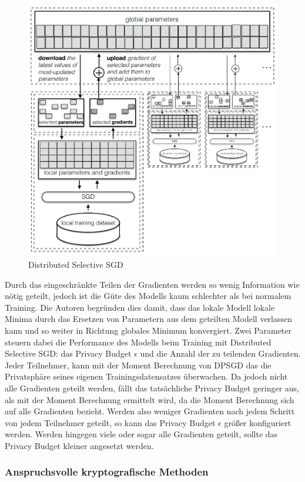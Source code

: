 \begin{figure}[!htb]
    \centering
    \includegraphics[width=12cm]{figures/dssgd}
    \caption{Distributed Selective SGD \cite{P-78}}
    \label{fig:dssgd}
\end{figure} 

Durch das eingeschränkte Teilen der Gradienten werden so wenig Information wie nötig geteilt, jedoch ist die Güte des Modells kaum schlechter als bei normalem Training.
Die Autoren begründen dies damit, dass das lokale Modell lokale Minima durch das Ersetzen von Parametern aus dem geteilten Modell verlassen kann und so weiter in Richtung globales Minimum konvergiert. 
Zwei Parameter steuern dabei die Performance des Modells beim Training mit Distributed Selective SGD: das Privacy Budget $\epsilon$ und die Anzahl der zu teilenden Gradienten.
Jeder Teilnehmer, kann mit der Moment Berechnung von DPSGD \cite{P-28} das die Privatsphäre seines eigenen Trainingsdatensatzes überwachen.
Da jedoch nicht alle Gradienten geteilt werden, fällt das tatsächliche Privacy Budget geringer aus, als mit der Moment Berechnung ermittelt wird, da die Moment Berechnung sich auf alle Gradienten bezieht.
Werden also weniger Gradienten nach jedem Schritt von jedem Teilnehmer geteilt, so kann das Privacy Budget $\epsilon$ größer konfiguriert werden.
Werden hingegen viele oder sogar alle Gradienten geteilt, sollte das Privacy Budget kleiner angesetzt werden.

\subsubsection*{Anspruchsvolle kryptografische Methoden}

